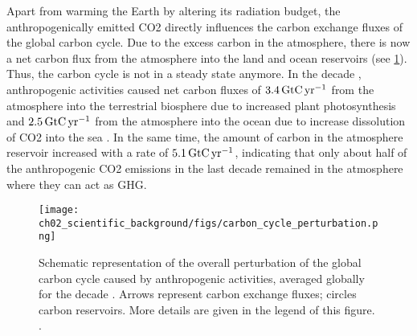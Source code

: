 Apart from warming the Earth by altering its radiation budget, the
anthropogenically emitted \ac{CO2} directly influences the carbon exchange
fluxes of the global carbon cycle. Due to the excess carbon in the atmosphere,
there is now a net carbon flux from the atmosphere into the land and ocean
reservoirs (see \cref{fig:02:carbon_cycle_perturbation}). Thus, the carbon
cycle is not in a steady state anymore. In the decade ,
anthropogenic activities caused net carbon fluxes of $3.4 \unit{\GtCyr{}}$ from
the atmosphere into the terrestrial biosphere due to increased plant
photosynthesis and $2.5 \unit{\GtCyr{}}$ from the atmosphere into the ocean due
to increase dissolution of \ac{CO2} into the sea \autocite{Friedlingstein2020}.
In the same time, the amount of carbon in the atmosphere reservoir increased
with a rate of $5.1 \unit{\GtCyr{}}$, indicating that only about half of the
anthropogenic \ac{CO2} emissions in the last decade remained in the atmosphere
\autocite{Friedlingstein2020} where they can act as \ac{GHG}.

\begin{figure}[t]
  \centering
  \texttt{[image: 
    ch02\_scientific\_background/figs/carbon\_cycle\_perturbation.png]}
  \caption[
    Schematic representation of the overall perturbation of the global carbon
    cycle caused by anthropogenic activities.
  ]{
    Schematic representation of the overall perturbation of the global carbon
    cycle caused by anthropogenic activities, averaged globally for the decade
    . Arrows represent carbon exchange fluxes; circles carbon
    reservoirs. More details are given in the legend of this figure.
    .
  }
  \label{fig:02:carbon_cycle_perturbation}
\end{figure}


